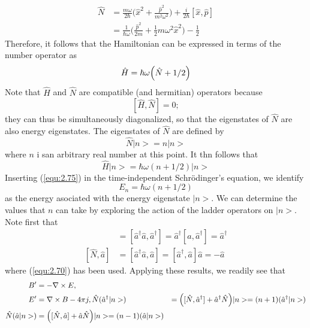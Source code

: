\begin{align}
  \hat{N} &= \frac{m\omega}{2\hbar} \biggl(\hat{x}^2 +
  \frac{\hat{p}^2}{m^2 \omega^2}\biggr) +
  \frac{i}{2\hbar}[\hat{x},  \hat{p}] \nonumber \\
  &=
  \frac{1}{\hbar\omega}\biggl(\frac{\hat{p}^2}{2m}+\frac{1}{2}m\omega^2
  \hat{x}^2\biggr) - \frac{1}{2} \label{equ:2.72}
\end{align}
Therefore, it follows that the Hamiltonian can be expressed
in terms of the number operator as
\begin{equation}
  \hat{H} = \hbar\omega \Bigl(\hat{N}+1/2\Bigr)
  \label{equ:2.73}
\end{equation}
Note that $\hat{H}$ and $\hat{N}$ are compatible (and
hermitian) operators because
$$
[\hat{H},  \hat{N}] = 0;
$$
they can thus be simultaneously diagonalized, so that the
eigenstates of $\hat{N}$ are also energy eigenstates.
The eigenstates of $\hat{N}$ are defined by
\begin{equation}
  \hat{N} |n>= n |n>
  \label{equ:2.74}
\end{equation}
where $n$ i san arbitrary real number at this point. It thn
follows that
\begin{equation}
  \hat{H} |n> = \hbar\omega (n+1/2)|n>
  \label{equ:2.75}
\end{equation}
Inserting (\ref{equ:2.75}) in the time-independent
Schrödinger's equation, we identify
$$
E_n = \hbar\omega (n+1/2)
$$
as the energy asociated with the energy eigenstate $|n>$.
We can determine the values that $n$ can take by exploring
the action of the ladder operators on $|n>$. Note first that
\begin{align}
  [\hat{N}, \hat{a}^{\dagger}] &=
  [\hat{a}^{\dagger}\hat{a},\hat{a}^{\dagger}] =
  \hat{a}^{\dagger}[\hat{a}, \hat{a}^{\dagger}] =
  \hat{a}^{\dagger} \nonumber\\
  [\hat{N}, \hat{a}] &= [\hat{a}^{\dagger}\hat{a}, \hat{a}]
  = [\hat{a}^{\dagger}, \hat{a}] \hat{a}=  - \hat{a}
  \label{equ:2.76}
\end{align}
where (\ref{equ:2.70}) has been used. Applying these
results, we readily see that
\begin{subequations}
  \begin{align}
            B'&=-\nabla \times E,\\
            E'&=\nabla \times B - 4\pi j,
    \hat{N} (\hat{a}^{\dagger} |n>) &=
    \Bigl([\hat{N},\hat{a}^{\dagger}]+\hat{a}^{\dagger}\hat{N}\Bigr)|n>
    = (n+1)(\hat{a}^{\dagger} |n>) \label{equ:2.77a} \\
    \hat{N}(\hat{a}|n>) &= \Bigl([\hat{N},
  \hat{a}]+\hat{a}\hat{N}\Bigr) |n> = (n-1) (\hat{a}|n>)
  \label{equ:2.77b}
  \end{align}
\end{subequations}
